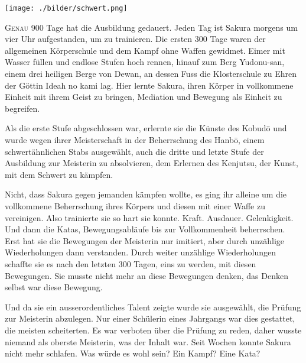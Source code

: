 ﻿\thispagestyle{empty}
\begin{center}
\texttt{[image: ./bilder/schwert.png]}
\end{center}
\vspace*{\fill}
{\centering\fontsize{50}{48} \color{farbe}\par}
\newpage
\lettrine[lines=3, lhang=.2, loversize=.25, lraise=0.05, findent=0.1em,
nindent=0em]{G}{enau} 900 Tage hat die Ausbildung gedauert. Jeden Tag ist Sakura morgens um vier Uhr aufgestanden, um zu trainieren. Die ersten 300 Tage waren der allgemeinen Körperschule und dem Kampf ohne Waffen gewidmet. Eimer mit Wasser füllen und endlose Stufen hoch rennen, hinauf zum Berg Yudonu-san, einem drei heiligen Berge von Dewan, an dessen Fuss die Klosterschule zu Ehren der Göttin Ideah no kami lag. Hier lernte Sakura, ihren Körper in vollkommene Einheit mit ihrem Geist zu bringen, Mediation und Bewegung als Einheit zu begreifen.

Als die erste Stufe abgeschlossen war, erlernte sie die Künste des Kobudō und wurde wegen ihrer Meisterschaft in der Beherrschung des Hanbō, einem schwertähnlichen Stabs ausgewählt, auch die dritte und letzte Stufe der Ausbildung zur Meisterin zu absolvieren, dem Erlernen des Kenjutsu, der Kunst, mit dem Schwert zu kämpfen.

Nicht, dass Sakura gegen jemanden kämpfen wollte, es ging ihr alleine um die vollkommene Beherrschung ihres Körpers und diesen mit einer Waffe zu vereinigen. Also trainierte sie so hart sie konnte. Kraft. Ausdauer. Gelenkigkeit. Und dann die Katas, Bewegungsabläufe bis zur Vollkommenheit beherrschen. Erst hat sie die Bewegungen der Meisterin nur imitiert, aber durch unzählige Wiederholungen dann verstanden. Durch weiter unzählige Wiederholungen schaffte sie es nach den letzten 300 Tagen, eins zu werden, mit diesen Bewegungen. Sie musste nicht mehr an diese Bewegungen denken, das Denken selbst war diese Bewegung.

Und da sie ein ausserordentliches Talent zeigte wurde sie ausgewählt, die Prüfung zur Meisterin abzulegen. Nur einer Schülerin eines Jahrgangs war dies gestattet, die meisten scheiterten. Es war verboten über die Prüfung zu reden, daher wusste niemand als oberste Meisterin, was der Inhalt war. Seit Wochen konnte Sakura nicht mehr schlafen. Was würde es wohl sein? Ein Kampf? Eine Kata?

